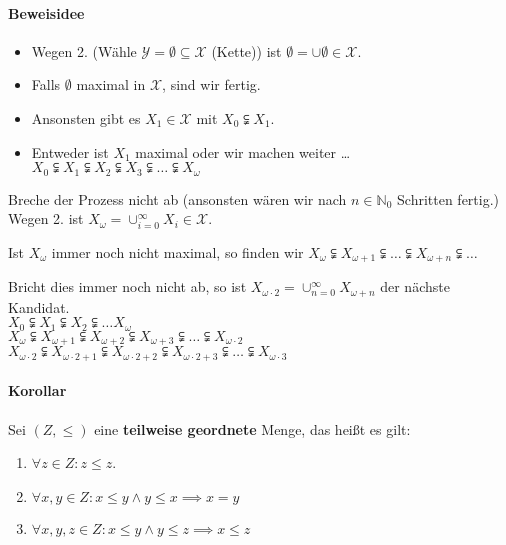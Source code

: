 \documentclass[14pt,a4paper]{article}
\newcommand{\N}{\ensuremath{\mathbb{N}}}
\newcommand{\Nzero}{\ensuremath{\N_0}}
\begin{document}
  \paragraph{Beweisidee}
  \begin{itemize}
  \item Wegen 2. (Wähle $\mathscr{Y = \emptyset \subseteq X}$ (Kette)) ist $\emptyset
  = \cup \emptyset \in \mathscr{X}$.
  \item Falls $\emptyset$ maximal in $\mathscr{X}$, sind wir fertig.
  \item Ansonsten gibt es $X_1 \in \mathscr{X}$ mit $X_0 \subsetneqq X_1$.
  \item Entweder ist $X_1$ maximal oder wir machen weiter … \\
    $X_0 \subsetneqq X_1 \subsetneqq X_2 \subsetneqq X_3 \subsetneqq \ldots
    \subsetneqq X_\omega$
  \end{itemize}

  Breche der Prozess nicht ab (ansonsten wären wir nach $n \in \Nzero$ Schritten
  fertig.)\\
  Wegen 2. ist $X_\omega = \cup_{i=0}^{\infty} X_i \in \mathscr{X}$.

  Ist $X_\omega$ immer noch nicht maximal, so finden wir $X_\omega \subsetneqq
  X_{\omega + 1} \subsetneqq \ldots \subsetneqq X_{\omega + n} \subsetneqq
  \ldots$

  Bricht dies immer noch nicht ab, so ist $X_{\omega \cdot 2} = \cup_{n=0}^{\infty} X_{\omega +
    n}$ der nächste Kandidat.\\%
  $X_0 \subsetneqq X_1 \subsetneqq X_2 \subsetneqq \ldots X_\omega$\\
  $X_\omega  \subsetneqq X_{\omega+1} \subsetneqq X_{\omega+2} \subsetneqq
  X_{\omega+3} \subsetneqq \ldots \subsetneqq X_{\omega \cdot 2}$\\
  $X_{\omega\cdot2}  \subsetneqq X_{\omega\cdot2+1} \subsetneqq X_{\omega\cdot2+2} \subsetneqq
  X_{\omega\cdot2+3} \subsetneqq \ldots \subsetneqq X_{\omega \cdot 3}$

  \paragraph{Korollar}
  Sei $(Z, \leq)$ eine \textbf{teilweise geordnete} Menge, das heißt es gilt:
  \begin{enumerate}
    \item $\forall z \in Z : z \leq z$.
    \item $\forall x,y \in Z : x \leq y \land y \leq x \implies x = y $
    \item $\forall x,y,z \in Z : x \leq y \land y \leq z \implies x \leq z$
  \end{enumerate}
\end{document}
